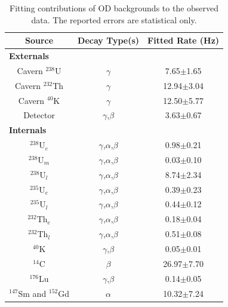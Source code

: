 \begin{table}[!htbp]
    \centering
    \begin{tabular}{c|c|c}
        Source               &  Decay Type(s)               & Fitted Rate (Hz) \\ \hline
        \multicolumn{3}{l}{\textbf{Externals}} \\
        Cavern ${}^{238}$U   & $\gamma$                     & 7.65$\pm$1.65                    \\ 
        Cavern ${}^{232}$Th  & $\gamma$                     & 12.94$\pm$3.04                    \\ 
        Cavern ${}^{40}$K    & $\gamma$                     & 12.50$\pm$5.77                    \\ 
        Detector             & $\gamma$,$\beta$             & 3.63$\pm$0.67              \\ \hline
        \multicolumn{3}{l}{\textbf{Internals}} \\
        ${}^{238}$U$_{e}$     & $\gamma$,$\alpha$,$\beta$   & 0.98$\pm$0.21                    \\ 
        ${}^{238}$U$_{m}$     & $\gamma$,$\alpha$,$\beta$   & 0.03$\pm$0.10                   \\
        ${}^{238}$U$_{l}$     & $\gamma$,$\alpha$,$\beta$   & 8.74$\pm$2.34                \\
        ${}^{235}$U$_{e}$     & $\gamma$,$\alpha$,$\beta$   & 0.39$\pm$0.23                    \\
        ${}^{235}$U$_{l}$     & $\gamma$,$\alpha$,$\beta$   & 0.44$\pm$0.12                    \\
        ${}^{232}$Th$_{e}$    & $\gamma$,$\alpha$,$\beta$   & 0.18$\pm$0.04                    \\
        ${}^{232}$Th$_{l}$    & $\gamma$,$\alpha$,$\beta$   & 0.51$\pm$0.08                  \\
        ${}^{40}$K          & $\gamma$,$\beta$              & 0.05$\pm$0.01                 \\
        ${}^{14}$C          & $\beta$                       & 26.97$\pm$7.70           \\
        ${}^{176}$Lu        & $\gamma$,$\beta$              & 0.14$\pm$0.05               \\
        ${}^{147}$Sm and ${}^{152}$Gd    & $\alpha$         & 10.32$\pm$7.24                     
        
    \end{tabular}
    \caption{Fitting contributions of OD backgrounds to the observed data. The reported errors are statistical only.}
    \label{tab:od_fitted_background_rates}
\end{table}


